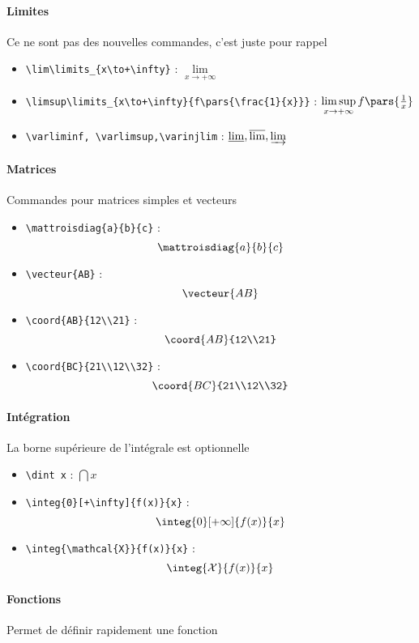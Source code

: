 \paragraph{Limites} Ce ne sont pas des nouvelles commandes, c'est juste pour rappel
\begin{itemize}
    \item \verb=\lim\limits_{x\to+\infty}= : $\lim\limits_{x\to+\infty}$
    \item \verb=\limsup\limits_{x\to+\infty}{f\pars{\frac{1}{x}}}= : $\limsup\limits_{x\to+\infty}{f\pars{\frac{1}{x}}}$
    \item \verb=\varliminf, \varlimsup,\varinjlim= : $\varliminf, \varlimsup,\varinjlim$
\end{itemize}

\paragraph{Matrices} Commandes pour matrices simples et vecteurs
\begin{itemize}
    \item \verb=\mattroisdiag{a}{b}{c}= : $$\mattroisdiag{a}{b}{c}$$
    \item \verb=\vecteur{AB}= : $$\vecteur{AB}$$
    \item \verb=\coord{AB}{12\\21}= : $$\coord{AB}{12\\21}$$
    \item \verb=\coord{BC}{21\\12\\32}= : $$\coord{BC}{21\\12\\32}$$
\end{itemize}


\paragraph{Intégration} La borne supérieure de l'intégrale est optionnelle
\begin{itemize}
    \item \verb=\dint x= : $\dint x$
    \item \verb=\integ{0}[+\infty]{f(x)}{x}= : $$\integ{0}[+\infty]{f(x)}{x}$$
    \item \verb=\integ{\mathcal{X}}{f(x)}{x}= : $$\integ{\mathcal{X}}{f(x)}{x}$$
\end{itemize}


\paragraph{Fonctions} Permet de définir rapidement une fonction

